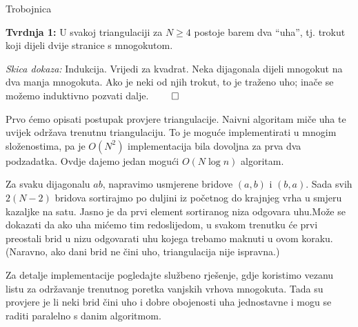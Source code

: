 \begin{statement}[
  problempoints=110,
  timelimit=1 second,
  memorylimit=512 MiB,
]{Trobojnica}



\textbf{Tvrdnja 1: } \; U svakoj triangulaciji za $N \ge 4$ postoje barem dva ``uha'', tj. trokut
koji dijeli dvije stranice s mnogokutom.

\emph{Skica dokaza: } \; Indukcija. Vrijedi za kvadrat.
Neka dijagonala dijeli mnogokut na dva manja mnogokuta. Ako je neki od njih trokut, to je traženo uho;
inače se možemo induktivno pozvati dalje. $\qed$

Prvo ćemo opisati postupak provjere triangulacije.
Naivni algoritam miče uha te uvijek održava trenutnu triangulaciju. To je moguće implementirati
u mnogim složenostima, pa je $O(N^2)$ implementacija bila dovoljna za prva dva podzadatka.
Ovdje dajemo jedan mogući $O(N \log n)$ algoritam.

Za svaku dijagonalu $ab$, napravimo usmjerene bridove $(a, b)$ i $(b, a)$. Sada svih $2(N-2)$
bridova sortirajmo po duljini iz početnog do krajnjeg vrha u smjeru kazaljke na satu.
Jasno je da prvi element sortiranog niza odgovara uhu.Može se dokazati da ako uha mićemo
tim redoslijedom, u svakom trenutku će prvi preostali brid u nizu odgovarati uhu
kojega trebamo maknuti u ovom koraku. (Naravno, ako dani brid ne čini uho, triangulacija
nije ispravna.)

Za detalje implementacije pogledajte službeno rješenje, gdje koristimo vezanu listu za održavanje
trenutnog poretka vanjskih vrhova mnogokuta. Tada su provjere je li neki brid čini uho i dobre
obojenosti uha jednostavne i mogu se raditi paralelno s danim algoritmom.

\end{statement}

